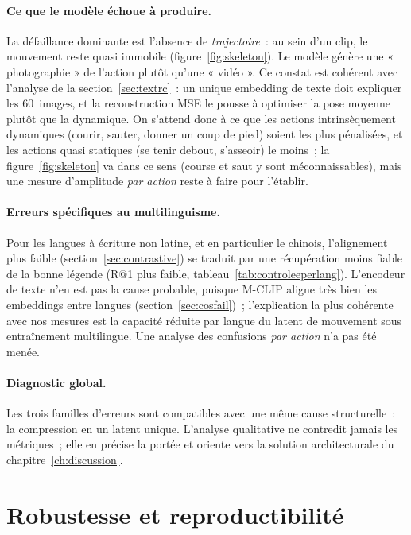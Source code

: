\documentclass[12pt,a4paper,oneside]{report}
\theoremstyle{definition}
\theoremstyle{plain}
\begin{document}
\paragraph{Ce que le modèle échoue à produire.} La défaillance dominante est
l'absence de \emph{trajectoire}~: au sein d'un clip, le mouvement reste quasi
immobile (figure~\ref{fig:skeleton}). Le modèle génère une « photographie » de
l'action plutôt qu'une « vidéo ». Ce constat est cohérent avec l'analyse de la
section~\ref{sec:textrc}~: un unique embedding de texte doit expliquer les
60~images, et la reconstruction MSE le pousse à optimiser la pose moyenne plutôt
que la dynamique. On s'attend donc à ce que les actions intrinsèquement
dynamiques (courir, sauter, donner un coup de pied) soient les plus pénalisées, et
les actions quasi statiques (se tenir debout, s'asseoir) le moins~; la
figure~\ref{fig:skeleton} va dans ce sens (course et saut y sont méconnaissables),
mais une mesure d'amplitude \emph{par action} reste à faire pour l'établir.

\paragraph{Erreurs spécifiques au multilinguisme.} Pour les langues à écriture non
latine, et en particulier le chinois, l'alignement plus faible
(section~\ref{sec:contrastive}) se traduit par une récupération moins fiable de la
bonne légende (R@1 plus faible, tableau~\ref{tab:controleeperlang}). L'encodeur de
texte n'en est pas la cause probable, puisque M-CLIP aligne très bien les
embeddings entre langues (section~\ref{sec:cosfail})~; l'explication la plus
cohérente avec nos mesures est la capacité réduite par langue du latent de
mouvement sous entraînement multilingue. Une analyse des confusions \emph{par
action} n'a pas été menée.

\paragraph{Diagnostic global.} Les trois familles d'erreurs sont compatibles avec
une même cause structurelle~: la compression en un latent unique. L'analyse qualitative
ne contredit jamais les métriques~; elle en précise la portée et oriente vers la
solution architecturale du chapitre~\ref{ch:discussion}.

\section{Robustesse et reproductibilité}
\label{sec:robust}
\end{document}
